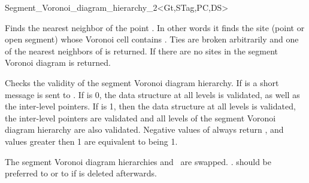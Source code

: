 \begin{ccRefClass}{Segment_Voronoi_diagram_hierarchy_2<Gt,STag,PC,DS>}


%
{Finds the nearest neighbor of the point . In other words it
finds the site (point or open segment) whose Voronoi cell contains
. Ties are broken arbitrarily and one of the nearest neighbors
of  is returned. If there are no sites in the
segment Voronoi diagram  is returned.}
%
\ccGlue
{}



%
{Checks the validity of the segment Voronoi diagram hierarchy. If
 is  a short message is sent to
. If  is 0, the data structure at all levels 
is validated, as well as the inter-level pointers. If  is
1, then the data structure at all levels is validated, the inter-level
pointers are validated and all levels of the segment Voronoi diagram
hierarchy are also validated. Negative values of  always
return , and values greater then 1 are equivalent to
 being 1.}

%
\ccGlue
{The segment Voronoi diagram hierarchies  and \ccVar\ are
swapped. \ccVar. should be preferred to \ccVar{} or to \ccVar{} if  is deleted afterwards.}



\end{ccRefClass}
